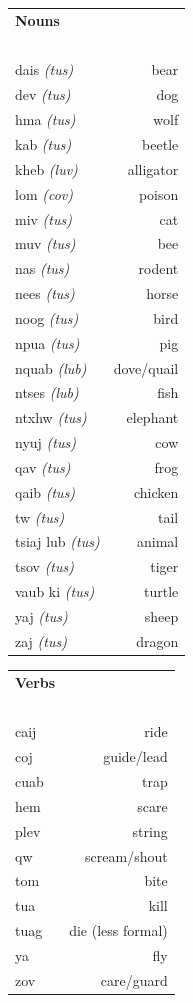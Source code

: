 \documentclass{article}
\begin{document}
\clearpage

\begin{multicols}{2}
[
\section*{}
]

\begin{tabular}{l r}
\textbf{Nouns} \\
~\\
dais {\em (tus)} &bear\\
dev {\em (tus)} &dog\\
hma {\em (tus)} &wolf\\
kab {\em (tus)} &beetle\\
kheb {\em (luv)} &alligator\\
lom {\em (cov)} &poison\\
miv {\em (tus)} &cat\\
muv {\em (tus)} &bee\\
nas {\em (tus)} &rodent\\
nees {\em (tus)} &horse\\
noog {\em (tus)} &bird\\
npua {\em (tus)} &pig\\
nquab {\em (lub)} &dove/quail\\
ntses {\em (lub)} &fish\\
ntxhw {\em (tus)} &elephant\\
nyuj {\em (tus)} &cow\\
qav {\em (tus)} &frog\\
qaib {\em (tus)} &chicken\\
tw {\em (tus)} &tail\\
tsiaj lub {\em (tus)} &animal\\
tsov {\em (tus)} &tiger\\
vaub ki {\em (tus)} &turtle\\
yaj {\em (tus)} &sheep\\
zaj {\em (tus)} &dragon\\
\end{tabular}

\begin{tabular}{l r}
\textbf{Verbs} \\
~\\
caij &ride\\
coj &guide/lead\\
cuab &trap\\
hem &scare\\
plev &string\\
qw &scream/shout\\
tom &bite\\
tua &kill\\
tuag &die (less formal)\\
ya &fly\\
zov &care/guard\\
\end{tabular}
\end{multicols}
\end{document}
